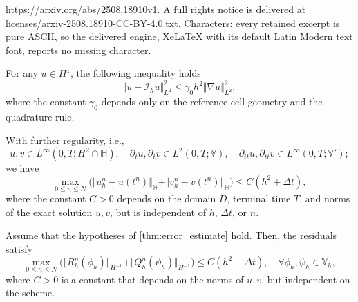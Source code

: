 \documentclass[10pt,a4paper]{amsart}
\newcommand{\HH}{\mathbb{H}}
\newcommand{\VV}{\mathbb{V}}
\newcommand{\mI}{\mathcal{I}}
\begin{document}
https://arxiv.org/abs/2508.18910v1. A full rights notice is delivered at licenses/arxiv-2508.18910-CC-BY-4.0.txt. Characters: every retained excerpt is pure ASCII, so the delivered engine, XeLaTeX with its default Latin Modern text font, reports no missing character.
	\begin{lemma}\label{lem:approx_pty}
		For any $u\in H^1$, the following inequality holds
		\begin{equation*}
			\Vert u-\mI_h u\Vert_{L^2}^2\leq \gamma_0h^2\Vert\nabla u\Vert^2_{L^2},
		\end{equation*}
		where the constant $\gamma_0$ depends only on the reference cell geometry and the quadrature rule.
	\end{lemma}

	\begin{theorem}\label{thm:error_estimate}
		With further regularity, i.e.,
		\[
		u, v \in L^\infty(0,T; H^2\cap\HH),\quad \partial_t u, \partial_t v \in L^2(0,T; \VV),\quad \partial_{tt} u, \partial_{tt} v \in L^\infty(0,T; \VV');
		\]
		we have
		\begin{equation*}
			\max_{0\leq n\leq N} \Big(\Vert u_h^n - u(t^n) \Vert_{\HH} + \Vert v_h^n - v(t^n) \Vert_{\HH}\Big)\leq C(h^2 + \Delta t),
		\end{equation*}
		where the constant $C>0$ depends on the domain $D$, terminal time $T$, and norms of the exact solution $u, v$, but is independent of $h$, $\Delta t$, or $n$.
	\end{theorem}

	\begin{lemma}\label{lem:residuals}
		Assume that the hypotheses of \cref{thm:error_estimate} hold. Then, the residuals satisfy  
		\begin{equation*}
			\max_{0\leq n\leq N} \Big(\Vert R_h^n(\phi_h)\Vert_{H^{-1}} + \Vert Q_h^n(\psi_h)\Vert_{H^{-1}}\Big)\leq C(h^2 + \Delta t),\quad\forall \phi_h,\psi_h\in \VV_h,
		\end{equation*}
		where $C>0$ is a constant that depends on the norms of $u,v$, but independent on the scheme.
	\end{lemma}
\end{document}
